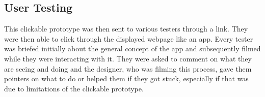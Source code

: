 \documentclass[10pt,twocolumn]{article} %
\begin{document}
\subsection*{User Testing}

This clickable prototype was then sent to various testers through a link. They were then able to click through the displayed webpage like an app. Every tester was briefed initially about the general concept of the app and subsequently filmed while they were interacting with it. They were asked to comment on what they are seeing and doing and the designer, who was filming this process, gave them pointers on what to do or helped them if they got stuck, especially if that was due to limitations of the clickable prototype.

\end{document}
